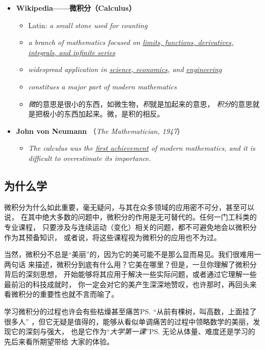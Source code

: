 \begin{itemize}
	  \item {\bf Wikipedia——微积分（Calculus）} 
	\begin{itemize}
	  \item Latin: {\it a small stone used for counting}  
	  \item {\it a branch of mathematics focused on \underline{limits, functions,
	  	derivatives, integrals, and infinite series}} 
  	  \item {\it widespread application in \underline{science, economics,} 
  	  and \underline{engineering}} 
	  \item {\it constitues a major part of modern mathematics}
	  \item {\it 微}的意思是很小的东西，如微生物，{\it 积}就是加起来的意思，
	  {\it 积分}的意思就是把极小的东西加起来。微，是积的相反。 
	\end{itemize}
	\item {\bf John von Neumann} （{\small\it The Mathematician, 1947}）
	\begin{itemize}
	  \item {\it The calculus was the \underline{first achievement} of modern
	  mathematics, and it is difficult to overestimate its importance.}
	\end{itemize} 
\end{itemize}

\subsection{为什么学}

微积分为什么如此重要，毫无疑问，与其在众多领域的应用密不可分，甚至可以说，
在其中绝大多数的问题中，微积分的作用是无可替代的。任何一门工科类的专业课程，
只要涉及与连续运动（变化）相关的问题，都不可避免地会以微积分作为其预备知识，
或者说，将这些课程视为微积分的应用也不为过。

当然，微积分不总是“美丽”的，因为它的美可能不是那么显而易见。我们很难用一两句话
来描述，微积分到底有什么用？它美在哪里？但是，一旦你理解了微积分背后的深刻思想，
开始能够将其应用于解决一些实际问题，或者通过它理解一些最前沿的科技成就时，
你一定会对它的美产生深深地赞叹，也许那时，再回头来看微积分的重要性也就不言而喻了。

学习微积分的过程也许会有些枯燥甚至痛苦\ps{“从前有棵树，叫高数，上面挂了很多人”}
，但它无疑是值得的，能够从看似单调痛苦的过程中领略数学的美丽，发现它的深刻与强大，
也是它作为“{\it 大学第一课}”\ps{无论从体量、难度还是学习的先后来看}所期望带给
大家的体验。

